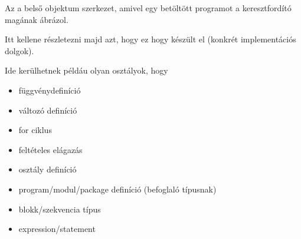 
Az a belső objektum szerkezet, amivel egy betöltött programot a keresztfordító magának ábrázol.

Itt kellene részletezni majd azt, hogy ez hogy készült el (konkrét implementációs dolgok).

Ide kerülhetnek példáu olyan osztályok, hogy
\begin{itemize}
\item függvénydefiníció
\item változó definíció
\item for ciklus
\item feltételes elágazás
\item osztály definíció
\item program/modul/package definíció (befoglaló típusnak)
\item blokk/szekvencia típus
\item expression/statement
\end{itemize}



